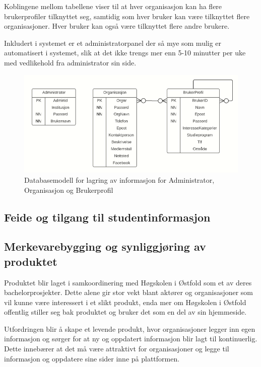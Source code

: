 Koblingene mellom tabellene viser til at hver organisasjon kan ha flere brukerprofiler tilknyttet seg, samtidig som hver bruker kan være tilknyttet flere organisasjoner. Hver bruker kan også være tilknyttet flere andre brukere.

Inkludert i systemet er et administratorpanel der så mye som mulig er automatisert i systemet, slik at det ikke trengs mer enn 5-10 minutter per uke med vedlikehold fra administrator sin side.
\\
\begin{figure}[H]
\includegraphics[width=\textwidth]{Illustrasjoner/databasemodell-2.png}
\caption{Databasemodell for lagring av informasjon for Administrator, Organisasjon og Brukerprofil}
\label{fig:databasemodell}
\end{figure}

\subsection{Feide og tilgang til studentinformasjon}

\subsection{Merkevarebygging og synliggjøring av produktet}

Produktet blir laget i samkoordinering med Høgskolen i Østfold som et av deres bachelorprosjekter. Dette alene gir stor vekt blant aktører og organisasjoner som vil kunne være interessert i et slikt produkt, enda mer om Høgskolen i Østfold offentlig stiller seg bak produktet og bruker det som en del av sin hjemmeside.

Utfordringen blir å skape et levende produkt, hvor organisasjoner legger inn egen informasjon og sørger for at ny og oppdatert informasjon blir lagt til kontinuerlig. Dette innebærer at det må være attraktivt for organisasjoner og legge til informasjon og oppdatere sine sider inne på plattformen.

